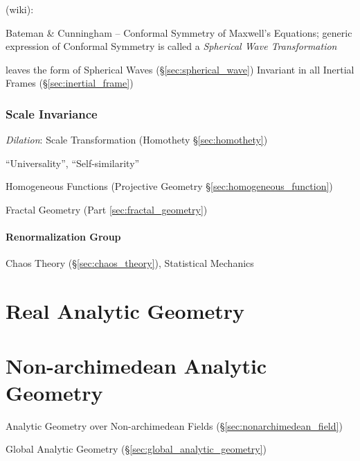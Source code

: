 \begin{itemize}
(wiki):

Bateman \& Cunningham -- Conformal Symmetry of Maxwell's Equations; generic
expression of Conformal Symmetry is called a \emph{Spherical Wave
  Transformation}

leaves the form of Spherical Waves (\S\ref{sec:spherical_wave}) Invariant in
all Inertial Frames (\S\ref{sec:inertial_frame})



\subsubsection{Scale Invariance}\label{sec:scale_invariance}

\emph{Dilation}: Scale Transformation (Homothety \S\ref{sec:homothety})

``Universality'', ``Self-similarity''

\fist Homogeneous Functions (Projective Geometry
\S\ref{sec:homogeneous_function})

\fist Fractal Geometry (Part \ref{sec:fractal_geometry})



\paragraph{Renormalization Group}\label{sec:renormalization_group}\hfill

Chaos Theory (\S\ref{sec:chaos_theory}), Statistical Mechanics



\section{Real Analytic Geometry}\label{sec:real_analytic_geometry}

\section{Non-archimedean Analytic Geometry}
\label{sec:nonarchimedean_analytic_geometry}

Analytic Geometry over Non-archimedean Fields (\S\ref{sec:nonarchimedean_field})

\fist Global Analytic Geometry (\S\ref{sec:global_analytic_geometry})




\end{itemize}
